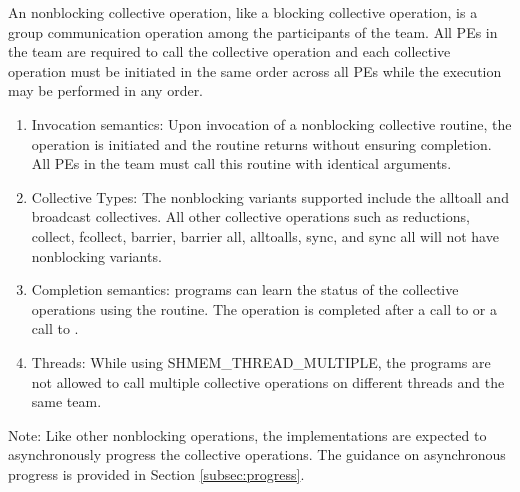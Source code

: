 An \openshmem nonblocking collective operation, like a blocking collective
operation, is a group communication operation among the
participants of the team. All \acp{PE} in the team are required to call the
collective operation and each collective operation must be initiated in the same
order across all \acp{PE} while the execution may be performed in any order.

\begin{enumerate}

\item Invocation semantics: Upon invocation of a nonblocking collective routine,
the operation is initiated and the routine returns without ensuring completion. All \acp{PE} in the team
must call this routine with identical arguments.

\item Collective Types: The nonblocking variants supported include the alltoall
and broadcast collectives. All other collective operations such as
reductions, collect, fcollect, barrier, barrier all, alltoalls, sync, and sync all will not have nonblocking variants.

\item Completion semantics: \openshmem programs can learn the status of the collective operations
using the  routine. The operation is completed after
a call to  or a call to .

\item Threads: While using SHMEM\_THREAD\_MULTIPLE, the \openshmem
programs are not allowed to call multiple collective operations on different threads
and the same team.

\end{enumerate}

Note: Like other nonblocking \openshmem operations, the implementations are
expected to asynchronously progress the collective operations. The guidance on
asynchronous progress is provided in Section \ref{subsec:progress}.
